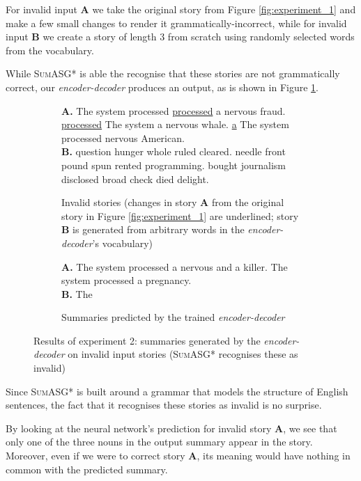 For invalid input \textbf{A} we take the original story from Figure \ref{fig:experiment_1} and make a few small changes to render it grammatically-incorrect, while for invalid input \textbf{B} we create a story of length 3 from scratch using randomly selected words from the vocabulary.

While \textsc{SumASG*} is able the recognise that these stories are not grammatically correct, our \textit{encoder-decoder} produces an output, as is shown in Figure \ref{fig:experiment_2}.

\begin{figure}[H]
\begin{subfigure}{\textwidth}
\begin{displayquote}
\textbf{A.} The system processed \underline{processed} a nervous fraud. \underline{processed} The system a nervous whale. \underline{a} The system processed nervous American. \\
\textbf{B.} question hunger whole ruled cleared. needle front pound spun rented programming. bought journalism disclosed broad check died delight.
\end{displayquote}
\caption{Invalid stories (changes in story \textbf{A} from the original story in Figure \ref{fig:experiment_1} are underlined; story \textbf{B} is generated from arbitrary words in the \textit{encoder-decoder}'s vocabulary)}
\vspace{\baselineskip}
\end{subfigure}
\begin{subfigure}{\textwidth}
\begin{displayquote}
\textbf{A.} The system processed a nervous and a killer. The system processed a pregnancy. \\
\textbf{B.} The
\end{displayquote}
\caption{Summaries predicted by the trained \textit{encoder-decoder}}
\end{subfigure}
\caption{Results of experiment 2: summaries generated by the \textit{encoder-decoder} on invalid input stories (\textsc{SumASG*} recognises these as invalid)}
\label{fig:experiment_2}
\end{figure}

\noindent
Since \textsc{SumASG*} is built around a grammar that models the structure of English sentences, the fact that it recognises these stories as invalid is no surprise.

By looking at the neural network's prediction for invalid story \textbf{A}, we see that only one of the three nouns in the output summary appear in the story. Moreover, even if we were to correct story \textbf{A}, its meaning would have nothing in common with the predicted summary.

